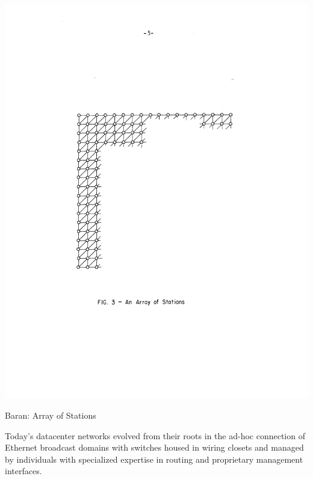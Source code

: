 \documentclass[../HFT-main.tex]{subfiles}
\begin{document}
 
 \begin{marginfigure}
  \includegraphics[width=\linewidth]{../figures/Baran-stations.pdf}
  \caption{Baran: Array of Stations}
    \vspace{12pt}
\end{marginfigure}
 
 

Today's datacenter networks evolved from their roots in the ad-hoc connection of Ethernet broadcast domains with switches housed in wiring closets and managed by individuals with specialized expertise in routing and proprietary management interfaces.
\end{document}
